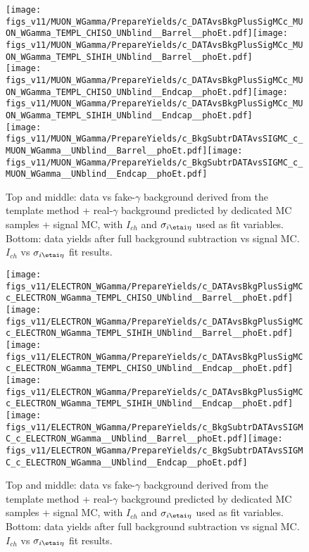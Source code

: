 \begin{figure}[htb]
  \begin{center}
   \texttt{[image: figs\_v11/MUON\_WGamma/PrepareYields/c\_DATAvsBkgPlusSigMCc\_MUON\_WGamma\_TEMPL\_CHISO\_UNblind\_\_Barrel\_\_phoEt.pdf]}\texttt{[image: figs\_v11/MUON\_WGamma/PrepareYields/c\_DATAvsBkgPlusSigMCc\_MUON\_WGamma\_TEMPL\_SIHIH\_UNblind\_\_Barrel\_\_phoEt.pdf]}  \\
   \texttt{[image: figs\_v11/MUON\_WGamma/PrepareYields/c\_DATAvsBkgPlusSigMCc\_MUON\_WGamma\_TEMPL\_CHISO\_UNblind\_\_Endcap\_\_phoEt.pdf]}\texttt{[image: figs\_v11/MUON\_WGamma/PrepareYields/c\_DATAvsBkgPlusSigMCc\_MUON\_WGamma\_TEMPL\_SIHIH\_UNblind\_\_Endcap\_\_phoEt.pdf]}  \\
\texttt{[image: figs\_v11/MUON\_WGamma/PrepareYields/c\_BkgSubtrDATAvsSIGMC\_c\_MUON\_WGamma\_\_UNblind\_\_Barrel\_\_phoEt.pdf]}\texttt{[image: figs\_v11/MUON\_WGamma/PrepareYields/c\_BkgSubtrDATAvsSIGMC\_c\_MUON\_WGamma\_\_UNblind\_\_Endcap\_\_phoEt.pdf]}\\
  \caption{Top and middle: data vs fake-$\gamma$ background derived from the template method + real-$\gamma$ background predicted by dedicated MC samples + signal MC, with $I_{ch}$ and $\sigma_{i\etai\eta}$ used as fit variables. Bottom: data yields after full background subtraction vs signal MC. $I_{ch}$ vs $\sigma_{i\etai\eta}$ fit results. }
  \label{fig:DDvsMC_Wg_Data_MUON}
  \end{center}
\end{figure}

\begin{figure}[htb]
  \begin{center}
   \texttt{[image: figs\_v11/ELECTRON\_WGamma/PrepareYields/c\_DATAvsBkgPlusSigMCc\_ELECTRON\_WGamma\_TEMPL\_CHISO\_UNblind\_\_Barrel\_\_phoEt.pdf]}\texttt{[image: figs\_v11/ELECTRON\_WGamma/PrepareYields/c\_DATAvsBkgPlusSigMCc\_ELECTRON\_WGamma\_TEMPL\_SIHIH\_UNblind\_\_Barrel\_\_phoEt.pdf]}  \\
   \texttt{[image: figs\_v11/ELECTRON\_WGamma/PrepareYields/c\_DATAvsBkgPlusSigMCc\_ELECTRON\_WGamma\_TEMPL\_CHISO\_UNblind\_\_Endcap\_\_phoEt.pdf]}\texttt{[image: figs\_v11/ELECTRON\_WGamma/PrepareYields/c\_DATAvsBkgPlusSigMCc\_ELECTRON\_WGamma\_TEMPL\_SIHIH\_UNblind\_\_Endcap\_\_phoEt.pdf]}  \\
\texttt{[image: figs\_v11/ELECTRON\_WGamma/PrepareYields/c\_BkgSubtrDATAvsSIGMC\_c\_ELECTRON\_WGamma\_\_UNblind\_\_Barrel\_\_phoEt.pdf]}\texttt{[image: figs\_v11/ELECTRON\_WGamma/PrepareYields/c\_BkgSubtrDATAvsSIGMC\_c\_ELECTRON\_WGamma\_\_UNblind\_\_Endcap\_\_phoEt.pdf]}\\
  \caption{Top and middle: data vs fake-$\gamma$ background derived from the template method + real-$\gamma$ background predicted by dedicated MC samples + signal MC, with $I_{ch}$ and $\sigma_{i\etai\eta}$ used as fit variables. Bottom: data yields after full background subtraction vs signal MC. $I_{ch}$ vs $\sigma_{i\etai\eta}$ fit results. }
  \label{fig:DDvsMC_Wg_Data_ELECTRON}
  \end{center}
\end{figure}

